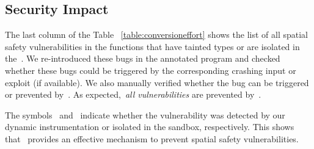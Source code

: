 \subsection{Security Impact}
\label{subsec:securityimpact}
The last column of the Table ~\ref{table:conversioneffort} shows the list of all spatial safety vulnerabilities in the functions that have tainted types or are isolated in the~\ucregion{}.
We re-introduced these bugs in the annotated program and checked whether these bugs could be triggered by the corresponding crashing input or exploit (if available).
We also manually verified whether the bug can be triggered or prevented by~\systemname{}.
As expected,~\emph{all vulnerabilities} are prevented by~\systemname{}.

The symbols~\vulprevented{} and~\vulisolated{} indicate whether the vulnerability was detected by our dynamic instrumentation or isolated in the sandbox, respectively.
This shows that~\systemname{} provides an effective mechanism to prevent spatial safety vulnerabilities.

% 






